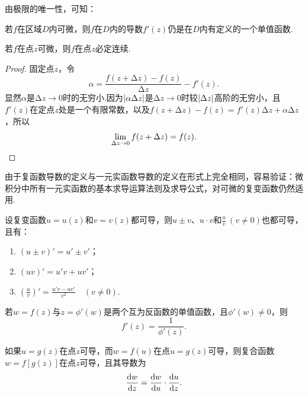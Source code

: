 由极限的唯一性，可知：
\begin{theorem}
若\(f\)在区域\(D\)内可微，则\(f\)在\(D\)内的导数\(f'(z)\)仍是在\(D\)内有定义的一个单值函数.
\end{theorem}

\begin{theorem}[可微的必要条件]
若\(f\)在点\(z\)可微，则\(f\)在点\(z\)必定连续.
\begin{proof}
固定点\(z\)，令\begin{equation*}
\alpha = \frac{f(z+\increment z)-f(z)}{\increment z} - f'(z).
\end{equation*}显然\(\alpha\)是\(\increment z \to 0\)时的无穷小.因为\(\abs{\alpha \Delta z}\)是\(\increment z \to 0\)时较\(\abs{\Delta z}\)高阶的无穷小，且\(f'(z)\)在定点\(z\)处是一个有限常数，以及\(f(z+\increment z) - f(z) = f'(z) \increment z + \alpha \increment z\)，所以\begin{equation*}
\lim_{\Delta z \to 0} f(z + \Delta z) = f(z).
\qedhere
\end{equation*}
\end{proof}
\end{theorem}

由于复函数导数的定义与一元实函数导数的定义在形式上完全相同，容易验证：微积分中所有一元实函数的基本求导运算法则及求导公式，对可微的复变函数仍然适用.
\begin{theorem}\label{theorem:解析函数.函数的和差积商的导数}
设复变函数\(u=u(z)\)和\(v=v(z)\)都可导，则\(u \pm v\)、\(u \cdot v\)和\(\frac{u}{v}\ (v\neq0)\)也都可导，且有：
\begin{enumerate}
\item \((u \pm v)' = u' \pm v'\)；
\item \((u v)' = u' v + u v'\)；
\item \(\left(\frac{u}{v}\right)' = \frac{u' v - u v'}{v^2} \quad (v \neq 0)\).
\end{enumerate}
\end{theorem}

\begin{theorem}\label{theorem:解析函数.反函数的导数}
若\(w=f(z)\)与\(z=\phi'(w)\)是两个互为反函数的单值函数，且\(\phi'(w) \neq 0\)，则\begin{equation*}
f'(z) = \frac{1}{\phi'(z)}.
\end{equation*}
\end{theorem}

\begin{theorem}\label{theorem:解析函数.复合函数的导数}
如果\(u=g(z)\)在点\(z\)可导，而\(w=f(u)\)在点\(u=g(z)\)可导，则复合函数\(w=f[g(z)]\)在点\(z\)可导，且其导数为\begin{equation*}
\dv{w}{z} = \dv{w}{u} \cdot \dv{u}{z}.
\end{equation*}
\end{theorem}

